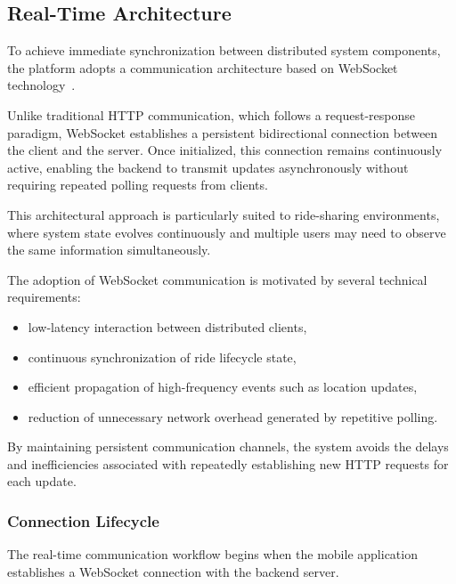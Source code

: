
\subsection{Real-Time Architecture}

To achieve immediate synchronization between distributed system components, the platform adopts a communication architecture based on WebSocket technology~\cite{websocket, pimentel2012websocket}.

Unlike traditional HTTP communication, which follows a request-response paradigm, WebSocket establishes a persistent bidirectional connection between the client and the server. Once initialized, this connection remains continuously active, enabling the backend to transmit updates asynchronously without requiring repeated polling requests from clients.

This architectural approach is particularly suited to ride-sharing environments, where system state evolves continuously and multiple users may need to observe the same information simultaneously.

The adoption of WebSocket communication is motivated by several technical requirements:

\begin{itemize}
    \item low-latency interaction between distributed clients,
    \item continuous synchronization of ride lifecycle state,
    \item efficient propagation of high-frequency events such as location updates,
    \item reduction of unnecessary network overhead generated by repetitive polling.
\end{itemize}

By maintaining persistent communication channels, the system avoids the delays and inefficiencies associated with repeatedly establishing new HTTP requests for each update.


\subsubsection{Connection Lifecycle}

The real-time communication workflow begins when the mobile application establishes a WebSocket connection with the backend server.

